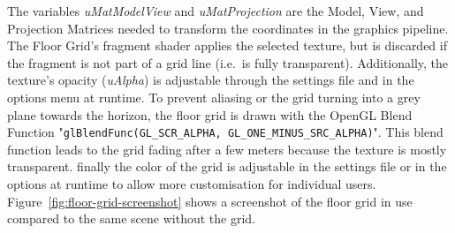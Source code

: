 The variables \textit{uMatModelView} and \textit{uMatProjection} are the Model, View, and Projection Matrices needed
to transform the coordinates in the graphics pipeline.
The Floor Grid's fragment shader applies the selected texture, but is discarded if the fragment is not part of a grid
line (i.e.\ is fully transparent).
Additionally, the texture's opacity (\textit{uAlpha}) is adjustable through the settings file and
in the options menu at runtime.
To prevent aliasing or the grid turning into a grey plane towards the horizon, the floor grid is drawn with the
OpenGL Blend Function "\texttt{glBlendFunc(GL_SCR_ALPHA, GL_ONE_MINUS_SRC_ALPHA)}".
This blend function leads to the grid fading after a few meters because the texture is mostly transparent.
finally the color of the grid is adjustable in the settings file or in the options at runtime to allow more
customisation for individual users.
Figure~\ref{fig:floor-grid-screenshot} shows a screenshot of the floor grid in use compared to the same scene without
the grid.
